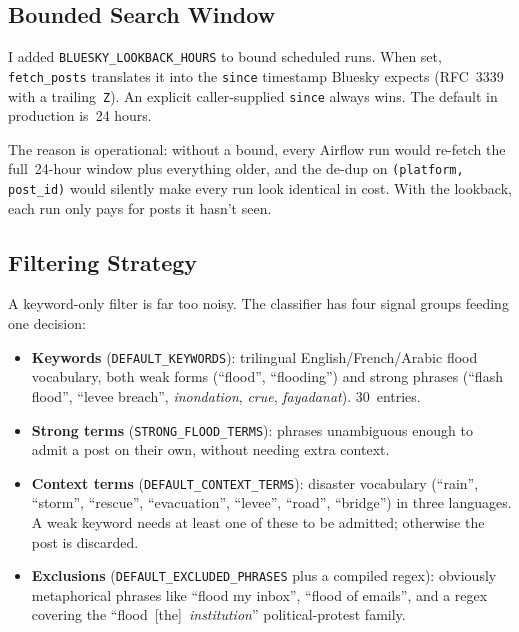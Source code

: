 \documentclass[11pt]{article}
\begin{document}
\subsection{Bounded Search Window}

I added \texttt{BLUESKY\_LOOKBACK\_HOURS} to bound scheduled runs. When
set, \texttt{fetch\_posts} translates it into the \texttt{since}
timestamp Bluesky expects (RFC~3339 with a trailing~\texttt{Z}). An
explicit caller-supplied \texttt{since} always wins. The default in
production is~24 hours.

The reason is operational: without a bound, every Airflow run would
re-fetch the full~24-hour window plus everything older, and the de-dup
on \texttt{(platform, post\_id)} would silently make every run look
identical in cost. With the lookback, each run only pays for posts it
hasn't seen.

\subsection{Filtering Strategy}

A keyword-only filter is far too noisy. The classifier has four signal
groups feeding one decision:

\begin{itemize}[leftmargin=*]
  \item \textbf{Keywords} (\texttt{DEFAULT\_KEYWORDS}): trilingual
        English/French/Arabic flood vocabulary, both weak forms
        (``flood'', ``flooding'') and strong phrases (``flash flood'',
        ``levee breach'', \emph{inondation}, \emph{crue},
        \emph{fayadanat}). 30~entries.
  \item \textbf{Strong terms} (\texttt{STRONG\_FLOOD\_TERMS}): phrases
        unambiguous enough to admit a post on their own, without needing
        extra context.
  \item \textbf{Context terms} (\texttt{DEFAULT\_CONTEXT\_TERMS}):
        disaster vocabulary (``rain'', ``storm'', ``rescue'',
        ``evacuation'', ``levee'', ``road'', ``bridge'') in three
        languages. A weak keyword needs at least one of these to be
        admitted; otherwise the post is discarded.
  \item \textbf{Exclusions} (\texttt{DEFAULT\_EXCLUDED\_PHRASES} plus a
        compiled regex): obviously metaphorical phrases like ``flood my
        inbox'', ``flood of emails'', and a regex covering the
        ``flood~[the]~\textit{institution}'' political-protest family.
\end{itemize}
\end{document}
